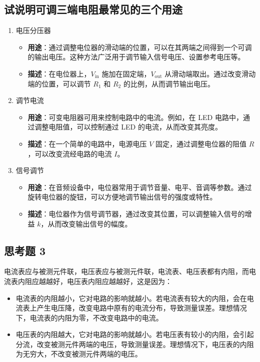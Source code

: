 \documentclass[a4paper,utf8]{article}
\begin{document}
\subsection{试说明可调三端电阻最常见的三个用途}
\begin{enumerate}
    \item 电压分压器
    \begin{itemize}
        \item \textbf{用途}：通过调整电位器的滑动端的位置，可以在其两端之间得到一个可调的输出电压。这种方法广泛用于调节输入信号电压、设置参考电压等。
        \item \textbf{描述}：在电位器上，$V_{\text{in}}$ 施加在固定端，$V_{\text{out}}$ 从滑动端取出。通过改变滑动端的位置，可以调节 $R_1$ 和 $R_2$ 的比例，从而调节输出电压。
    \end{itemize}
    \item 调节电流
    \begin{itemize}
        \item \textbf{用途}：可变电阻器可用来控制电路中的电流。例如，在 LED 电路中，通过调整电阻值，可以控制通过 LED 的电流，从而改变其亮度。
        \item \textbf{描述}：在一个简单的电路中，电源电压 $V$ 固定，通过调整电位器的阻值 $R$，可以改变流经电路的电流 $I$。
    \end{itemize}
    \item 信号调节
    \begin{itemize}
        \item \textbf{用途}：在音频设备中，电位器常用于调节音量、电平、音调等参数。通过旋转电位器的旋钮，可以方便地调节输出信号的强度或特性。
        \item \textbf{描述}：电位器作为信号调节器，通过改变其位置，可以调整输入信号的增益 $k$，从而改变输出信号的幅度。
    \end{itemize}
\end{enumerate}
\subsection{思考题 3}
电流表应与被测元件\uline{}联，电压表应与被测元件\uline{}联，电流表、电压表都有内阻，而电流表内阻应越\uline{}越好，电压表内阻应越\uline{}越好，这是因为：
\begin{itemize}
    \item 电流表的内阻越小，它对电路的影响就越小。若电流表有较大的内阻，会在电流表上产生电压降，改变电路中原有的电流分布，导致测量误差。理想情况下，电流表的内阻为零，不改变电路中的电流。
    \item 电压表的内阻越大，它对电路的影响就越小。若电压表有较小的内阻，会引起分流，改变被测元件两端的电压，导致测量误差。理想情况下，电压表的内阻为无穷大，不改变被测元件两端的电压。
\end{itemize}
\end{document}
